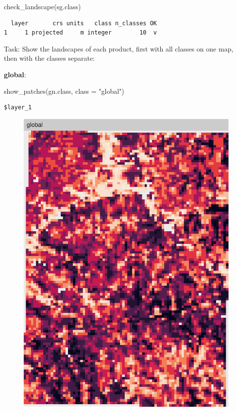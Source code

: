 \documentclass[
  letterpaper,
  DIV=11,
  numbers=noendperiod]{scrartcl}
\newenvironment{Shaded}{\begin{snugshade}}{\end{snugshade}}
\newcommand{\AttributeTok}[1]{\textcolor[rgb]{0.40,0.45,0.13}{#1}}
\newcommand{\FunctionTok}[1]{\textcolor[rgb]{0.28,0.35,0.67}{#1}}
\newcommand{\NormalTok}[1]{\textcolor[rgb]{0.00,0.23,0.31}{#1}}
\newcommand{\StringTok}[1]{\textcolor[rgb]{0.13,0.47,0.30}{#1}}
\begin{document}
\begin{Shaded}
\begin{Highlighting}[]
\FunctionTok{check\_landscape}\NormalTok{(sg.class)}
\end{Highlighting}
\end{Shaded}

\begin{verbatim}
  layer       crs units   class n_classes OK
1     1 projected     m integer        10  v
\end{verbatim}

Task: Show the landscapes of each product, first with all classes on one
map, then with the classes separate:

\textbf{global}:

\begin{Shaded}
\begin{Highlighting}[]
\FunctionTok{show\_patches}\NormalTok{(gn.class, }\AttributeTok{class =} \StringTok{"global"}\NormalTok{)}
\end{Highlighting}
\end{Shaded}

\begin{verbatim}
$layer_1
\end{verbatim}

\begin{figure}[H]

{\centering \includegraphics{PatternAnalysisWorkshopTutorial_files/figure-pdf/show.patches.global-1.pdf}

}

\end{figure}
\end{document}
